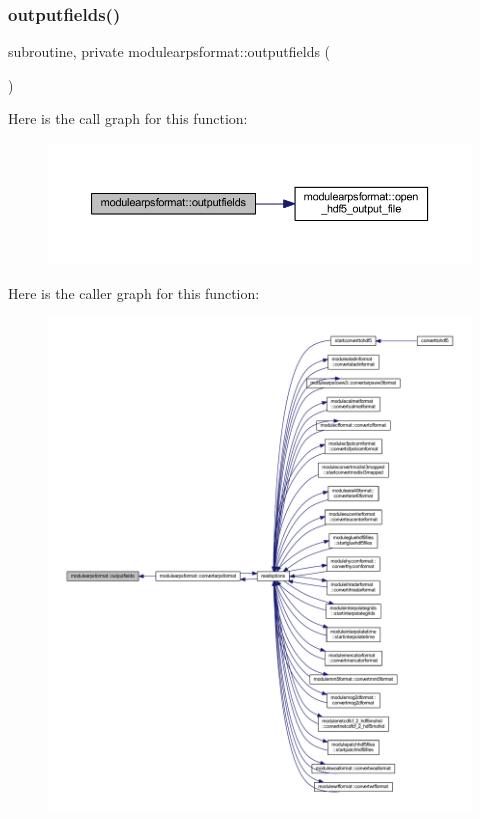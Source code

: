 \subsubsection{\texorpdfstring{outputfields()}{outputfields()}}
{\footnotesize\ttfamily subroutine, private modulearpsformat\+::outputfields (\begin{DoxyParamCaption}{ }\end{DoxyParamCaption})\hspace{0.3cm}{\ttfamily [private]}}

Here is the call graph for this function\+:\nopagebreak
\begin{figure}[H]
\begin{center}
\leavevmode
\includegraphics[width=350pt]{namespacemodulearpsformat_a3feae8181a739c2898e331dd969e3c67_cgraph}
\end{center}
\end{figure}
Here is the caller graph for this function\+:\nopagebreak
\begin{figure}[H]
\begin{center}
\leavevmode
\includegraphics[width=350pt]{namespacemodulearpsformat_a3feae8181a739c2898e331dd969e3c67_icgraph}
\end{center}
\end{figure}
\mbox{\label{namespacemodulearpsformat_a51cf1784c51ab9940cffc068600d53ac}} 
